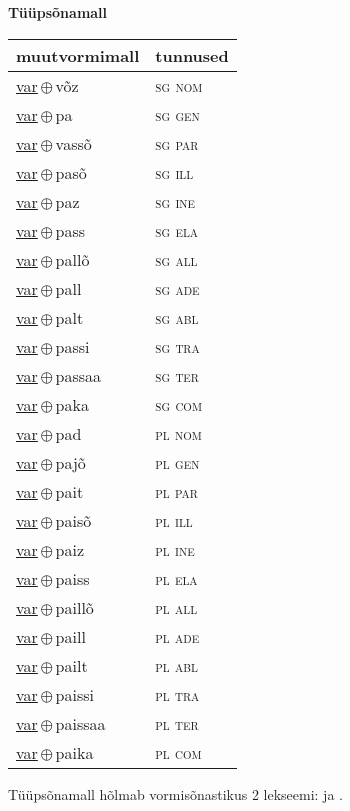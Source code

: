 

\vspace{3.5em}
\noindent \begin{minipage}{\textwidth}
\noindent \textbf{Tüüpsõnamall \,}\\

\begin{sideways}
\begin{tabular}{l l}
muutvormimall & tunnused \\
\hline
\underline{var}\,$\oplus$\,võz & \textsc{ sg nom } \\
\underline{var}\,$\oplus$\,pa & \textsc{ sg gen } \\
\underline{var}\,$\oplus$\,vassõ & \textsc{ sg par } \\
\underline{var}\,$\oplus$\,pasõ & \textsc{ sg ill } \\
\underline{var}\,$\oplus$\,paz & \textsc{ sg ine } \\
\underline{var}\,$\oplus$\,pass & \textsc{ sg ela } \\
\underline{var}\,$\oplus$\,pallõ & \textsc{ sg all } \\
\underline{var}\,$\oplus$\,pall & \textsc{ sg ade } \\
\underline{var}\,$\oplus$\,palt & \textsc{ sg abl } \\
\underline{var}\,$\oplus$\,passi & \textsc{ sg tra } \\
\underline{var}\,$\oplus$\,passaa & \textsc{ sg ter } \\
\underline{var}\,$\oplus$\,paka & \textsc{ sg com } \\
\underline{var}\,$\oplus$\,pad & \textsc{ pl nom } \\
\underline{var}\,$\oplus$\,pajõ & \textsc{ pl gen } \\
\underline{var}\,$\oplus$\,pait & \textsc{ pl par } \\
\underline{var}\,$\oplus$\,paisõ & \textsc{ pl ill } \\
\underline{var}\,$\oplus$\,paiz & \textsc{ pl ine } \\
\underline{var}\,$\oplus$\,paiss & \textsc{ pl ela } \\
\underline{var}\,$\oplus$\,paillõ & \textsc{ pl all } \\
\underline{var}\,$\oplus$\,paill & \textsc{ pl ade } \\
\underline{var}\,$\oplus$\,pailt & \textsc{ pl abl } \\
\underline{var}\,$\oplus$\,paissi & \textsc{ pl tra } \\
\underline{var}\,$\oplus$\,paissaa & \textsc{ pl ter } \\
\underline{var}\,$\oplus$\,paika & \textsc{ pl com } \\
\end{tabular}
\end{sideways}
\label{tab:tüüpsõnamall-varvõz}

\end{minipage}

 
\vspace{1em}
\noindent Tüüpsõnamall  hõlmab vormisõnastikus 2 lekseemi:  ja .
